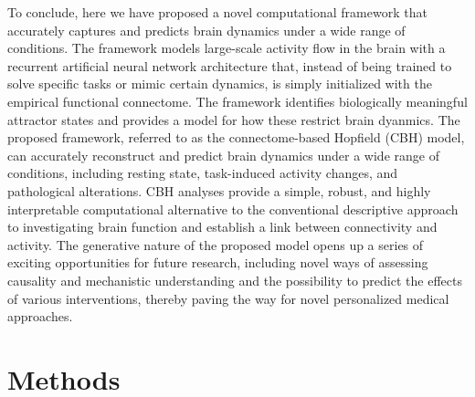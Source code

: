 \documentclass{article}
\begin{document}
To conclude, here we have proposed a novel computational framework that accurately captures and predicts brain dynamics under a wide range of conditions.
The framework models large-scale activity flow in the brain with a recurrent artificial neural network architecture that, instead of being trained to solve specific tasks or mimic certain dynamics, is simply initialized with the empirical functional connectome. The framework identifies biologically meaningful attractor states and provides a model for how these restrict brain dyanmics.
The proposed framework, referred to as the connectome-based Hopfield (CBH) model, can accurately reconstruct and predict brain dynamics under a wide range of conditions, including resting state, task-induced activity changes, and pathological alterations.
CBH analyses provide a simple, robust, and highly interpretable computational alternative to the conventional descriptive approach to investigating brain function and establish a link between connectivity and activity.
The generative nature of the proposed model opens up a series of exciting opportunities for future research, including novel ways of assessing causality and mechanistic understanding and the possibility to predict the effects of various interventions, thereby paving the way for novel personalized medical approaches.

\section{Methods}\label{Methods}
\end{document}
